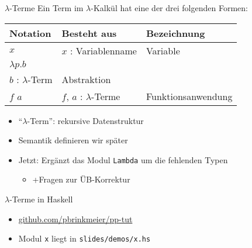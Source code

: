 \documentclass{beamer}
\begin{document}
\begin{frame}{$\lambda$-Terme}
	Ein Term im $\lambda$-Kalkül hat eine der drei folgenden Formen:

	\vspace{0.5cm}

	\begin{tabularx}{\textwidth}{ X | X | X }
		\textbf{Notation} & \textbf{Besteht aus}                      & \textbf{Bezeichnung} \\
		\hline
		$x$               & $x$ : Variablenname                       & Variable             \\
		\hline
		$\lambda{}p.b$    &
			\begin{tabular}[t]{@{}c@{}}$p$ : Variablenname\\$b$ : $\lambda$-Term\end{tabular}
									      & Abstraktion          \\
		\hline
		$f$ $a$           & $f$, $a$ : $\lambda$-Terme                & Funktionsanwendung   \\
	\end{tabularx}

	\vspace{0.5cm}

	\begin{itemize}
		\item \enquote{$\lambda$-Term}: rekursive Datenstruktur
		\item Semantik definieren wir später
		\pause
		\item Jetzt: Ergänzt das Modul \texttt{Lambda} um die fehlenden Typen
		\begin{itemize}
			\item +Fragen zur ÜB-Korrektur
		\end{itemize}
	\end{itemize}
\end{frame}

\begin{frame}{$\lambda$-Terme in Haskell}

	\begin{itemize}
                \item \href{https://github.com/pbrinkmeier/pp-tut}{github.com/pbrinkmeier/pp-tut}
		\item Modul \texttt{x} liegt in \texttt{slides/demos/x.hs}
	\end{itemize}
\end{frame}

\newcommand{\aeq}{\stackrel{\alpha}{=}}
\newcommand{\naeq}{\stackrel{\alpha}{\neq}}
\newcommand{\eeq}{\stackrel{\eta}{=}}
\end{document}
